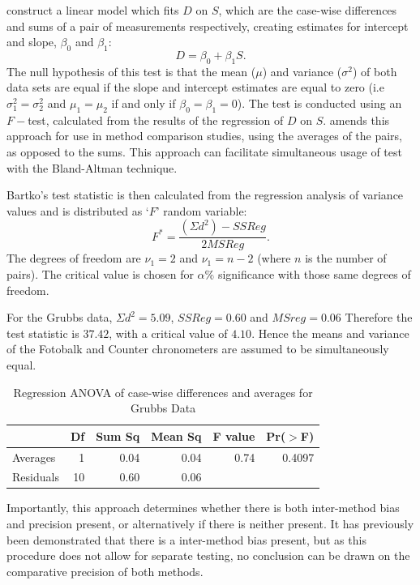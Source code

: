 \documentclass[12pt, a4paper]{report}
\theoremstyle{plain}
\theoremstyle{definition}
\theoremstyle{remark}
\begin{document}
\citet{BB89} construct a linear model which fits $D$ on $S$, which are the case-wise differences and sums of a pair of measurements respectively, creating estimates for intercept and slope, ${\beta}_{0}$ and ${\beta}_{1}$:
\[
D = \beta_{0} + \beta_{1}S.
\]
The null hypothesis of this test is that the mean ($\mu$) and variance
($\sigma^{2}$) of both data sets are equal if the slope and intercept estimates are equal to zero (i.e $\sigma^{2}_{1} = \sigma^{2}_{2}$ and $\mu_{1}=\mu_{2}$ if and only if $\beta_{0} = \beta_{1}=0$).
The test is conducted using an $F-$test, calculated from the results of the regression of $D$ on $S$. \citet{Bartko} amends this approach for use in method
comparison studies, using the averages of the pairs, as opposed to
the sums. This approach can facilitate simultaneous usage of test with the Bland-Altman technique.

Bartko's test statistic is then calculated from the regression analysis
of variance values \citep{BB89} and is distributed as `$F$' random
variable:
\[ F^{\ast} = \frac{(\Sigma d^{2})-SSReg}{2MSReg}.
\] The degrees of freedom are $\nu_{1}=2$ and $\nu_{1}=n-2$
(where $n$ is the number of pairs). The critical value is chosen
for $\alpha\%$ significance with those same degrees of freedom.

For the Grubbs data, $\Sigma d^{2}=5.09 $, $SSReg = 0.60$ and
$MSreg=0.06$ Therefore the test statistic is $37.42$, with a
critical value of $4.10$. Hence the means and variance of the
Fotobalk and Counter chronometers are assumed to be simultaneously
equal.

\begin{table}[ht]
	\begin{center}
		\begin{tabular}{lrrrrr}
			\hline
			& Df & Sum Sq & Mean Sq & F value & Pr($>$F) \\
			\hline
			Averages & 1 & 0.04 & 0.04 & 0.74 & 0.4097 \\
			Residuals & 10 & 0.60 & 0.06 &  &  \\
			\hline
		\end{tabular}
		\caption{Regression ANOVA of case-wise differences and averages
			for Grubbs Data}
	\end{center}
\end{table}

Importantly, this approach determines whether there is both inter-method bias and precision present, or alternatively if there is neither present. It has previously been demonstrated that there is a inter-method bias present, but as this procedure does not
allow for separate testing, no conclusion can be drawn on the
comparative precision of both methods.
\end{document}
